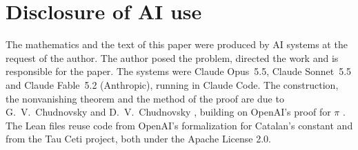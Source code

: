 \documentclass[11pt]{amsart}
\theoremstyle{definition}
\theoremstyle{remark}
\numberwithin{equation}{section}
\begin{document}
\section*{Disclosure of AI use}
The mathematics and the text of this paper were produced by AI systems at the request of the author. The author
posed the problem, directed the work and is responsible for the paper. The systems were Claude Opus~5.5, Claude
Sonnet~5.5 and Claude Fable~5.2 (Anthropic), running in Claude Code. The construction, the nonvanishing theorem
and the method of the proof are due to G.~V.~Chudnovsky and D.~V.~Chudnovsky \cite{Chudnovsky26,ChudnovskyChudnovsky26},
building on OpenAI's proof for $\pi$ \cite{OpenAIPi2026}. The Lean files reuse code from OpenAI's formalization
for Catalan's constant and from the Tau Ceti project, both under the Apache License 2.0.
\end{document}
